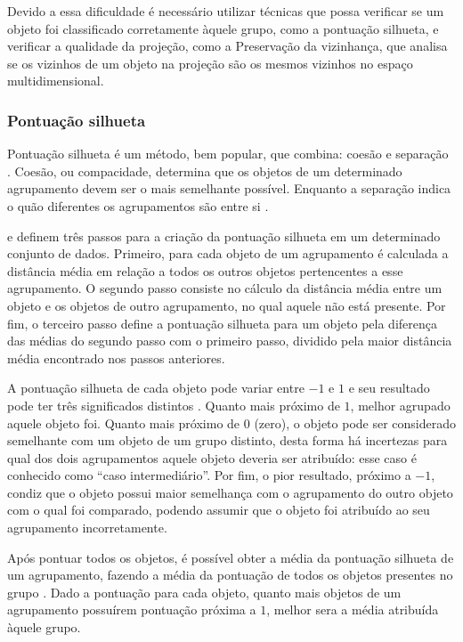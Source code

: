 			Devido a essa dificuldade é necessário utilizar técnicas que possa verificar
			se um objeto foi classificado corretamente àquele grupo, como a pontuação
			silhueta, e verificar a qualidade da projeção, como a Preservação da vizinhança,
			que analisa se os vizinhos de um objeto na projeção são os mesmos vizinhos
			no espaço multidimensional.
			
			\subsubsection{Pontuação silhueta}

				Pontuação silhueta é um método, bem popular, que combina: coesão e separação
				\cite{Tan:2005:ch8}. Coesão, ou compacidade, determina que os objetos
				de um determinado agrupamento devem ser o mais semelhante possível. Enquanto
				a separação indica o quão diferentes os agrupamentos são entre si
				\cite{Tan:2005:ch8, Berry:1997:DMT:560675}.
				
				 e  definem
				três passos para a criação da pontuação silhueta em um determinado conjunto
				de dados. Primeiro, para cada objeto de um agrupamento é calculada a distância
				média em relação a todos os outros objetos pertencentes a esse agrupamento.
				O segundo passo consiste no cálculo da distância média entre um objeto e 
				os objetos de outro agrupamento, no qual aquele não está presente. Por fim, o
				terceiro passo define a pontuação silhueta para um objeto pela diferença das
				médias do segundo passo com o primeiro passo, dividido pela maior distância média
				encontrado nos passos anteriores.
				
				A pontuação silhueta de cada objeto pode variar entre $-1$ e $1$ e seu resultado
				pode ter três significados distintos \cite{rousseeuw1987silhouettes}.
				Quanto mais próximo de $1$, melhor agrupado aquele objeto foi. Quanto mais
				próximo de $0$ (zero), o objeto pode ser considerado semelhante com um objeto
				de um grupo distinto, desta forma há incertezas para qual dos dois agrupamentos
				aquele objeto deveria ser atribuído: esse caso é conhecido como ``caso intermediário''.
				Por fim, o pior resultado, próximo a $-1$, condiz que o objeto possui maior
				semelhança com o agrupamento do outro objeto com o qual foi comparado, podendo
				assumir que o objeto foi atribuído ao seu agrupamento incorretamente.
				
				Após pontuar todos os objetos, é possível obter a média da pontuação silhueta
				de um agrupamento, fazendo a média da pontuação de todos os objetos presentes
				no grupo \cite{Tan:2005:ch8}. Dado a pontuação para cada objeto, quanto mais
				objetos de um agrupamento possuírem pontuação próxima a $1$, melhor sera a
				média atribuída àquele grupo.
				
